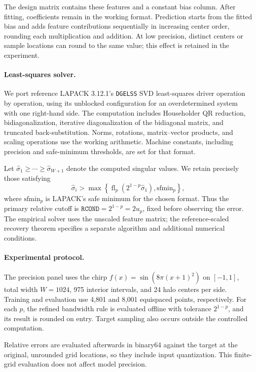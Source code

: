 The design matrix contains these features and a constant bias column.
After fitting, coefficients remain in the working format. Prediction
starts from the fitted bias and adds feature contributions sequentially
in increasing center order, rounding each multiplication and addition.
At low precision, distinct centers or sample locations can round to
the same value; this effect is retained in the experiment.

\paragraph{Least-squares solver.}
We port reference LAPACK 3.12.1's \texttt{DGELSS} SVD least-squares
driver operation by operation, using its unblocked configuration
for an overdetermined system with one right-hand side. The computation
includes Householder QR reduction, bidiagonalization, iterative
diagonalization of the bidiagonal matrix, and truncated
back-substitution. Norms, rotations, matrix--vector products, and
scaling operations use the working arithmetic. Machine constants,
including precision and safe-minimum thresholds, are set for that
format.

Let $\widehat{\sigma}_1\ge\cdots\ge\widehat{\sigma}_{W+1}$ denote the
computed singular values. We retain precisely those satisfying
\[
\widehat{\sigma}_i >
\max\!\left\{
  \operatorname{fl}_p\!\left(2^{1-p}\widehat{\sigma}_1\right),
  \mathrm{sfmin}_p
\right\},
\]
where $\mathrm{sfmin}_p$ is LAPACK's safe minimum for the chosen
format. Thus the primary relative cutoff is
$\texttt{RCOND}=2^{1-p}=2u_p$, fixed before observing the error.
The empirical solver uses the unscaled feature
matrix; the reference-scaled recovery theorem specifies a separate
algorithm and additional numerical conditions.

\paragraph{Experimental protocol.}
The precision panel uses the chirp
$f(x)=\sin(8\pi(x+1)^2)$ on $[-1,1]$, total width $W=1024$,
975 interior intervals, and 24 halo centers per side.
Training and evaluation use 4,801 and 8,001 equispaced points,
respectively. For each $p$, the refined bandwidth rule is evaluated
offline with tolerance $2^{1-p}$, and its result is rounded on entry.
Target sampling also occurs outside the controlled computation.

Relative errors are evaluated afterwards in binary64 against the target
at the original, unrounded grid locations, so they include input quantization.
This finite-grid evaluation does not affect model precision.

